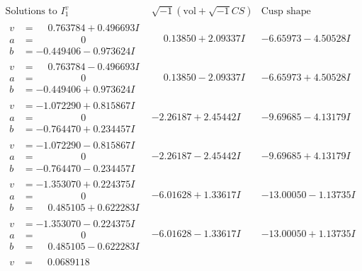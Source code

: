 \documentclass[1p]{elsarticle_modified}
\theoremstyle{definition}
\newcommand{\I}{\sqrt{-1}}
\begin{document}
$$\begin{array}{c|c|c}  
\text{Solutions to }I^v_{1}& \I (\text{vol} + \sqrt{-1}CS) & \text{Cusp shape}\\
 \hline 
\begin{aligned}
v &= \phantom{-}0.763784 + 0.496693 I \\
a &= \phantom{-0.000000 } 0 \\
b &= -0.449406 - 0.973624 I\end{aligned}
 & \phantom{-}0.13850 + 2.09337 I & -6.65973 - 4.50528 I \\ \hline\begin{aligned}
v &= \phantom{-}0.763784 - 0.496693 I \\
a &= \phantom{-0.000000 } 0 \\
b &= -0.449406 + 0.973624 I\end{aligned}
 & \phantom{-}0.13850 - 2.09337 I & -6.65973 + 4.50528 I \\ \hline\begin{aligned}
v &= -1.072290 + 0.815867 I \\
a &= \phantom{-0.000000 } 0 \\
b &= -0.764470 + 0.234457 I\end{aligned}
 & -2.26187 + 2.45442 I & -9.69685 - 4.13179 I \\ \hline\begin{aligned}
v &= -1.072290 - 0.815867 I \\
a &= \phantom{-0.000000 } 0 \\
b &= -0.764470 - 0.234457 I\end{aligned}
 & -2.26187 - 2.45442 I & -9.69685 + 4.13179 I \\ \hline\begin{aligned}
v &= -1.353070 + 0.224375 I \\
a &= \phantom{-0.000000 } 0 \\
b &= \phantom{-}0.485105 + 0.622283 I\end{aligned}
 & -6.01628 + 1.33617 I & -13.00050 - 1.13735 I \\ \hline\begin{aligned}
v &= -1.353070 - 0.224375 I \\
a &= \phantom{-0.000000 } 0 \\
b &= \phantom{-}0.485105 - 0.622283 I\end{aligned}
 & -6.01628 - 1.33617 I & -13.00050 + 1.13735 I \\ \hline\begin{aligned}
v &= \phantom{-}0.0689118\phantom{ +0.000000I} \\

\end{aligned}
\end{array}$$
\end{document}
